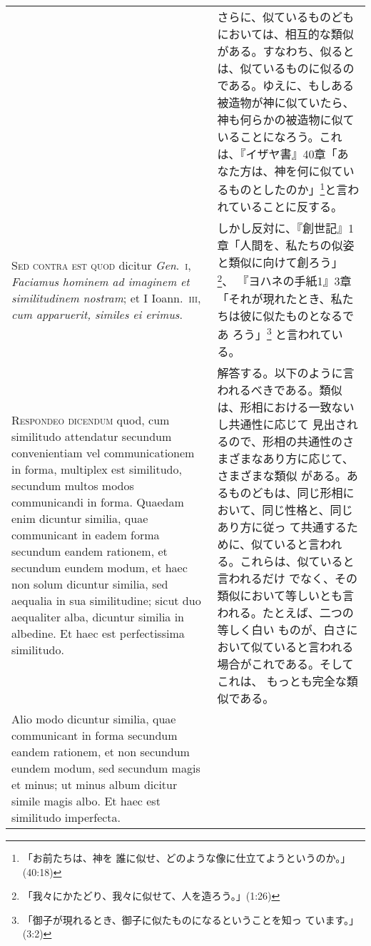 \documentclass[10pt]{jsarticle} %
\begin{document}
\begin{longtable}{p{21em}p{21em}}
&

さらに、似ているものどもにおいては、相互的な類似がある。すなわち、似ると
 は、似ているものに似るのである。ゆえに、もしある被造物が神に似ていたら、
 神も何らかの被造物に似ていることになろう。これは、『イザヤ書』40章「あ
 なた方は、神を何に似ているものとしたのか」\footnote{「お前たちは、神を
 誰に似せ、どのような像に仕立てようというのか。」(40:18)}と言われていることに反する。

\\

{\scshape Sed contra est quod} dicitur {\itshape Gen}.~{\scshape i}, {\itshape
 Faciamus hominem ad imaginem et similitudinem nostram}; et I
 Ioann.~{\scshape iii}, {\itshape cum apparuerit, similes ei erimus}.

&

しかし反対に、『創世記』1章「人間を、私たちの似姿と類似に向けて創ろう」
 \footnote{「我々にかたどり、我々に似せて、人を造ろう。」(1:26)}、
 『ヨハネの手紙1』3章「それが現れたとき、私たちは彼に似たものとなるであ
 ろう」\footnote{「御子が現れるとき、御子に似たものになるということを知っ
 ています。」(3:2)}
 と言われている。

\\

{\scshape Respondeo dicendum} quod, cum similitudo attendatur secundum
 convenientiam vel communicationem in forma, multiplex est similitudo,
 secundum multos modos communicandi in forma. Quaedam enim dicuntur
 similia, quae communicant in eadem forma secundum eandem rationem, et
 secundum eundem modum, et haec non solum dicuntur similia, sed aequalia
 in sua similitudine; sicut duo aequaliter alba, dicuntur similia in
 albedine. Et haec est perfectissima similitudo.

&


解答する。以下のように言われるべきである。類似は、形相における一致ないし共通性に応じて
 見出されるので、形相の共通性のさまざまなあり方に応じて、さまざまな類似
 がある。あるものどもは、同じ形相において、同じ性格と、同じあり方に従っ
 て共通するために、似ていると言われる。これらは、似ていると言われるだけ
 でなく、その類似において等しいとも言われる。たとえば、二つの等しく白い
 ものが、白さにおいて似ていると言われる場合がこれである。そしてこれは、
 もっとも完全な類似である。

\\

Alio modo dicuntur similia, quae communicant in forma secundum eandem
 rationem, et non secundum eundem modum, sed secundum magis et minus; ut
 minus album dicitur simile magis albo. Et haec est similitudo
 imperfecta.


\end{longtable}
\end{document}
